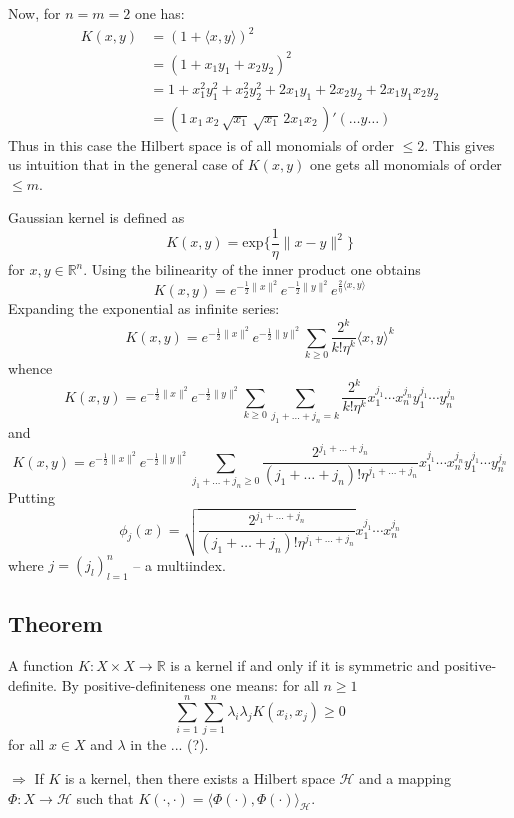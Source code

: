 \documentclass[a4paper]{article}
\newcommand{\Real}{\mathbb{R}}
\newcommand{\Hcal}{\mathcal{H}}
\begin{document}
Now, for $n=m=2$ one has:
\begin{align*}
	K(x,y)
	&= (1 + \langle x, y \rangle)^2 \\
	&= (1 + x_1 y_1 + x_2 y_2 )^2 \\
	&= 1 + x_1^2 y_1^2 + x_2^2 y_2^2 + 2 x_1 y_1 + 2 x_2 y_2 + 2 x_1 y_1 x_2 y_2\\
	&= ( 1\, x_1\, x_2\, \sqrt{x_1}\, \sqrt{x_1}\, 2x_1x_2\, )' (\ldots y \ldots)
\end{align*}
Thus in this case the Hilbert space is of all monomials of order $\leq 2$. This gives
us intuition that in the general case of $K(x,y)$ one gets all monomials of order $\leq m$.

Gaussian kernel is defined as
\[ K(x,y) = \text{exp}\bigl\{ \frac{1}{\eta} \|x-y\|^2\bigr\} \]
for $x,y\in \Real^n$. Using the bilinearity of the inner product one obtains
\[  K(x,y) = e^{-\frac{1}{2}\|x\|^2} e^{-\frac{1}{2}\|y\|^2} e^{ \frac{2}{\eta}\langle x, y \rangle } \]
Expanding the exponential as infinite series:
\[  K(x,y) = e^{-\frac{1}{2}\|x\|^2} e^{-\frac{1}{2}\|y\|^2} \sum_{k\geq0} \frac{2^k}{k! \eta^k} \langle x, y \rangle^k \]
whence
\[
K(x,y) = e^{-\frac{1}{2}\|x\|^2} e^{-\frac{1}{2}\|y\|^2}
\sum_{k\geq0} \sum_{j_1+\ldots+j_n = k} \frac{2^k}{k! \eta^k} x_1^{j_1}\cdots x_n^{j_n} y_1^{j_1}\cdots y_n^{j_n}
\]
and
\[
K(x,y)
= e^{-\frac{1}{2}\|x\|^2} e^{-\frac{1}{2}\|y\|^2}
\sum_{j_1+\ldots+j_n \geq 0} \frac{2^{j_1+\ldots+j_n}}{(j_1+\ldots+j_n)! \eta^{j_1+\ldots+j_n}}
x_1^{j_1}\cdots x_n^{j_n} y_1^{j_1}\cdots y_n^{j_n}
\]
Putting 
\[
\phi_j(x) = \sqrt{ \frac{2^{j_1+\ldots+j_n}}{(j_1+\ldots+j_n)! \eta^{j_1+\ldots+j_n}} } x_1^{j_1}\cdots x_n^{j_n}
\]
where $j = (j_l)_{l=1}^n$ -- a multiindex.


\subsection{Theorem} %
\label{sub:theorem}

A function $K:X\times X \to \Real$ is a kernel if and only if it is symmetric and
positive-definite. By positive-definiteness one means: for all $n\geq1$
\[ \sum_{i=1}^n \sum_{j=1}^n \lambda_i \lambda_j K(x_i, x_j) \geq 0 \]
for all $x \in X$ and $\lambda$ in the ... (?).

$\Rightarrow$ If $K$ is a kernel, then there exists a Hilbert space $\Hcal$ and
a mapping $\Phi:X\to \Hcal$ such that $K(\cdot, \cdot) = \langle \Phi(\cdot), \Phi(\cdot)\rangle_\Hcal$.
\end{document}
